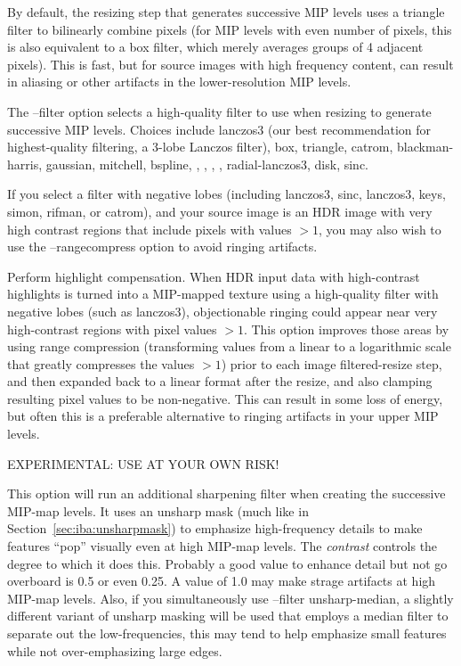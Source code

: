 By default, the resizing step that generates successive MIP levels
uses a triangle filter to bilinearly combine pixels (for MIP levels
with even number of pixels, this is also equivalent to a box filter,
which merely averages groups of 4 adjacent pixels).  This is fast,
but for source images with high frequency content, can result in 
aliasing or other artifacts in the lower-resolution MIP levels.

The {\cf --filter} option selects a high-quality filter to use when
resizing to generate successive MIP levels.  Choices include
{\cf lanczos3} (our best recommendation for highest-quality filtering, a
3-lobe Lanczos filter), {\cf box}, {\cf triangle}, {\cf catrom},
{\cf blackman-harris}, {\cf gaussian}, {\cf mitchell}, {\cf bspline},
, , ,
, {\cf radial-lanczos3}, {\cf disk}, {\cf sinc}.

If you select a filter with negative lobes (including
{\cf lanczos3}, {\cf sinc}, {\cf lanczos3}, {\cf keys}, {\cf simon},
{\cf rifman}, or {\cf catrom}), and your
source image is an HDR image with very high contrast regions that
include pixels with values $>1$, you may also wish to use the
{\cf --rangecompress} option to avoid ringing artifacts.
\apiend

Perform highlight compensation.  When HDR input data with high-contrast
highlights is turned into a MIP-mapped texture using a high-quality
filter with negative lobes (such as {\cf lanczos3}), objectionable
ringing could appear near very high-contrast regions with pixel values
$>1$. This option improves those areas by using range compression
(transforming values from a linear to a logarithmic scale that greatly
compresses the values $> 1$) prior to each
image filtered-resize step, and then expanded back to a linear format
after the resize, and also clamping resulting pixel values to be
non-negative.  This can result in some loss of energy, but often this is
a preferable alternative to ringing artifacts in your upper MIP levels.
\apiend

EXPERIMENTAL: USE AT YOUR OWN RISK!

This option will run an additional sharpening filter
when creating the successive MIP-map levels. It uses an unsharp mask
(much like in Section~\ref{sec:iba:unsharpmask}) to emphasize high-frequency
details to make features ``pop'' visually even at high MIP-map levels.
The \emph{contrast} controls the degree to which it does this. Probably
a good value to enhance detail but not go overboard is 0.5 or even 0.25.
A value of 1.0 may make strage artifacts at high MIP-map levels. Also, if
you simultaneously use {\cf --filter unsharp-median}, a slightly different
variant of unsharp masking will be used that employs a median filter to
separate out the low-frequencies, this may tend to help emphasize small
features while not over-emphasizing large edges. 
\apiend

